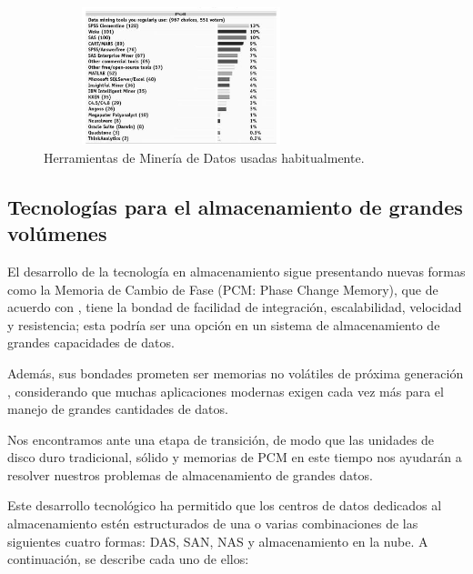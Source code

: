 \documentclass[10pt,journal]{IEEEtran}
\begin{document}
\begin{figure}[H]
 \begin{center}
       \includegraphics[width=8cm, height=4cm]{figuras/8.JPG}
      \caption{Herramientas de Minería de Datos usadas habitualmente.\citep{Poll}}
      \label{f8} 
      \end{center}
\end{figure}
\subsection{\textbf{Tecnologías para el almacenamiento de grandes volúmenes}} El desarrollo de la tecnología en almacenamiento sigue presentando nuevas formas como la Memoria de Cambio de Fase (PCM: Phase Change Memory), que de acuerdo con \citep{gopala}, tiene la bondad de facilidad de integración, escalabilidad, velocidad y resistencia; esta podría ser una opción en un sistema de almacenamiento de grandes capacidades de datos.
\par Además, sus bondades prometen ser memorias no volátiles de próxima generación \citep{yoon2013integrated}, considerando que muchas aplicaciones modernas exigen cada vez más para el manejo de grandes cantidades de datos. \par Nos encontramos ante una etapa de transición, de modo que las unidades de disco duro tradicional, sólido y memorias de PCM en este tiempo nos ayudarán a resolver nuestros problemas de almacenamiento de grandes datos.\par Este desarrollo tecnológico ha permitido que los centros de datos dedicados al almacenamiento estén estructurados de una o varias combinaciones de las siguientes cuatro formas: DAS, SAN, NAS y almacenamiento en la nube. A continuación, se describe cada uno de ellos:
\end{document}
